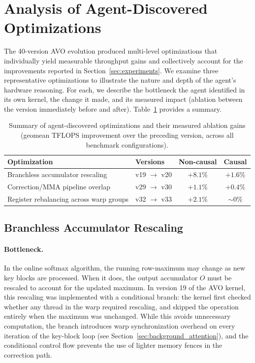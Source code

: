 \section{Analysis of Agent-Discovered Optimizations}
\label{sec:analysis}

The 40-version AVO evolution produced multi-level optimizations that individually yield measurable throughput gains and collectively account for the improvements reported in Section~\ref{sec:experiments}.
We examine three representative optimizations to illustrate the nature and depth of the agent's hardware reasoning.
For each, we describe the bottleneck the agent identified in its own kernel, the change it made, and its measured impact (ablation between the version immediately before and after).
Table~\ref{tab:opt_summary} provides a summary.

\begin{table}[t]
  \caption{Summary of agent-discovered optimizations and their measured ablation gains (geomean TFLOPS improvement over the preceding version, across all benchmark configurations).}
  \label{tab:opt_summary}
  \centering
  \small
  \begin{tabular}{llcc}
    \toprule
    Optimization & Versions & Non-causal & Causal \\
    \midrule
    Branchless accumulator rescaling & v19 $\to$ v20 & $+8.1\%$ & $+1.6\%$ \\
    Correction/MMA pipeline overlap & v29 $\to$ v30 & $+1.1\%$ & $+0.4\%$ \\
    Register rebalancing across warp groups & v32 $\to$ v33 & $+2.1\%$ & $\sim 0\%$ \\
    \bottomrule
  \end{tabular}
\end{table}

\subsection{Branchless Accumulator Rescaling}
\label{sec:analysis_branchless}

\paragraph{Bottleneck.}
In the online softmax algorithm, the running row-maximum may change as new key blocks are processed.
When it does, the output accumulator $O$ must be rescaled to account for the updated maximum.
In version 19 of the AVO kernel, this rescaling was implemented with a conditional branch: the kernel first checked whether any thread in the warp required rescaling, and skipped the operation entirely when the maximum was unchanged.
While this avoids unnecessary computation, the branch introduces warp synchronization overhead on every iteration of the key-block loop (see Section~\ref{sec:background_attention}), and the conditional control flow prevents the use of lighter memory fences in the correction path.

